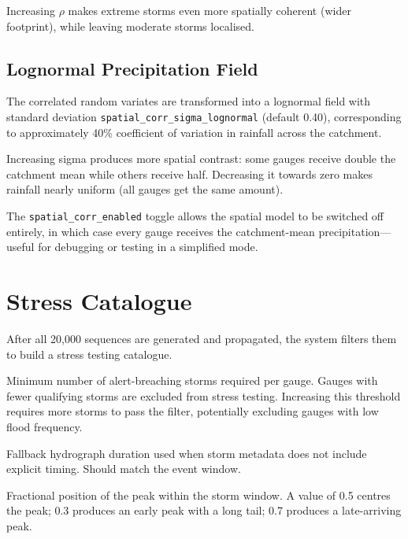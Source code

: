 \documentclass[11pt,a4paper]{article}
\begin{document}
Increasing $\rho$ makes extreme storms even more spatially coherent
(wider footprint), while leaving moderate storms localised.

\subsection{Lognormal Precipitation Field}

The correlated random variates are transformed into a lognormal field
with standard deviation \texttt{spatial\_corr\_sigma\_lognormal}
(default 0.40), corresponding to approximately 40\% coefficient of
variation in rainfall across the catchment.

Increasing sigma produces more spatial contrast: some gauges receive
double the catchment mean while others receive half.  Decreasing it
towards zero makes rainfall nearly uniform (all gauges get the same
amount).

The \texttt{spatial\_corr\_enabled} toggle allows the spatial model
to be switched off entirely, in which case every gauge receives the
catchment-mean precipitation---useful for debugging or testing in a
simplified mode.


\section{Stress Catalogue}
\label{ch:stress}

After all 20,000 sequences are generated and propagated, the system
filters them to build a stress testing catalogue.

\begin{description}[leftmargin=2em]
  \item[\texttt{stress\_storms\_min\_count} (default 50)] Minimum
        number of alert-breaching storms required per gauge.  Gauges
        with fewer qualifying storms are excluded from stress testing.
        Increasing this threshold requires more storms to pass the
        filter, potentially excluding gauges with low flood frequency.
  \item[\texttt{stress\_storm\_default\_duration\_hours} (default 168)]
        Fallback hydrograph duration used when storm metadata does not
        include explicit timing.  Should match the event window.
  \item[\texttt{stress\_storm\_default\_peak\_position} (default 0.5)]
        Fractional position of the peak within the storm window.  A
        value of 0.5 centres the peak; 0.3 produces an early peak with
        a long tail; 0.7 produces a late-arriving peak.
\end{description}
\end{document}

